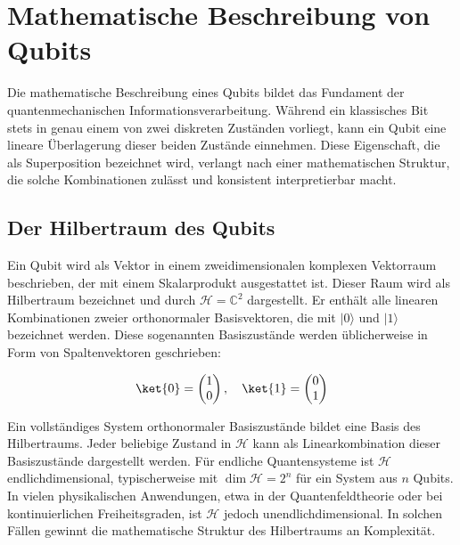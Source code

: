 \section{Mathematische Beschreibung von Qubits}
\label{Mathematische Beschreibung von Qubits}

Die mathematische Beschreibung eines Qubits bildet das Fundament der quantenmechanischen Informationsverarbeitung. Während ein klassisches Bit stets in genau einem von zwei diskreten Zuständen vorliegt, kann ein Qubit eine lineare Überlagerung dieser beiden Zustände einnehmen. Diese Eigenschaft, die als Superposition bezeichnet wird, verlangt nach einer mathematischen Struktur, die solche Kombinationen zulässt und konsistent interpretierbar macht.

\subsection{Der Hilbertraum des Qubits}
\label{subsec: Der Hilbertraum des Qubits}

Ein Qubit wird als Vektor in einem zweidimensionalen komplexen Vektorraum beschrieben, der mit einem Skalarprodukt ausgestattet ist. Dieser Raum wird als Hilbertraum bezeichnet und durch \( \mathcal{H} = \mathbb{C}^2 \) dargestellt. Er enthält alle linearen Kombinationen zweier orthonormaler Basisvektoren, die mit \( |0\rangle \) und \( |1\rangle \) bezeichnet werden. Diese sogenannten Basiszustände werden üblicherweise in Form von Spaltenvektoren geschrieben:

\[
\ket{0} = \begin{pmatrix} 1 \\ 0 \end{pmatrix}, \quad \ket{1} = \begin{pmatrix} 0 \\ 1 \end{pmatrix}
\]

Ein vollständiges System orthonormaler Basiszustände bildet eine Basis des Hilbertraums. Jeder beliebige Zustand in \( \mathcal{H} \) kann als Linearkombination dieser Basiszustände dargestellt werden. Für endliche Quantensysteme ist \( \mathcal{H} \) endlichdimensional, typischerweise mit \( \dim \mathcal{H} = 2^n \) für ein System aus \( n \) Qubits. In vielen physikalischen Anwendungen, etwa in der Quantenfeldtheorie oder bei kontinuierlichen Freiheitsgraden, ist \( \mathcal{H} \) jedoch unendlichdimensional. In solchen Fällen gewinnt die mathematische Struktur des Hilbertraums an Komplexität.

